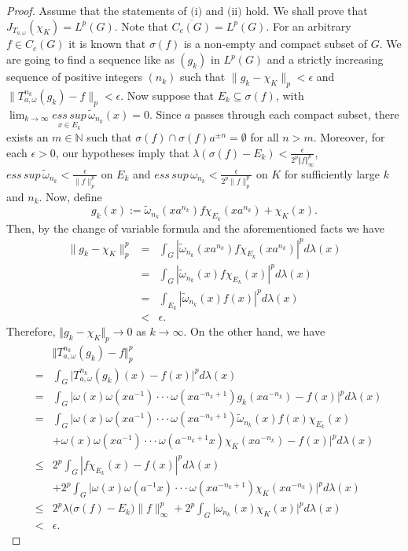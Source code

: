 \documentclass{amsart}
\theoremstyle{definition}\newtheorem{defn}[thm]{Definition}
\theoremstyle{remark}
\numberwithin{equation}{section}
\begin{document}
\begin{proof}
Assume that the statements of $\mbox{(i)}$ and $\mbox{(ii)}$ hold. We shall prove
that $J_{T_{a,\omega}}(\chi_K)=L^p(G)$. Note that
$\overline{C_c(G)}=L^p(G)$.
 For an arbitrary $f\in C_c(G)$ it is known that
$\sigma(f)$ is a non-empty and compact subset of $G$. We are going to find a
sequence like as $(g_k)$ in $L^p(G)$ and a strictly increasing sequence of positive integers $(n_k)$ such that
$\|g_k -\chi_K\|_p<\epsilon$ and $\|T_{a,\omega}^{n_k}(g_k)-f\|_p<\epsilon$.
Now suppose that $E_k\subseteq \sigma(f)$, with $\lim_{k\rightarrow
\infty}\underset{x\in E_{k}}{ess\,sup}\,
 \tilde{\omega}_{n_k}(x)=0$.  Since $a$ passes through  each compact subset,
  there exists an $m\in\mathbb{N}$ such that $\sigma(f) \cap
\sigma(f)a^{\pm n}=\emptyset$ for all $n>m$.
 Moreover, for each $\epsilon>0$, our hypotheses  imply that
$\lambda(\sigma(f)-E_k)<\frac{\epsilon} {2^p \Vert
f\Vert_{\infty}^{p}}$,
$ess\,sup\,\tilde{\omega}_{n_k}<\frac{\epsilon}{\|f\|_{p}^p}$ on $E_k$
and $ess\,sup\,\omega_{n_k}<\frac{\epsilon}{2^p\|f\|_{p}^p}$ on $K$
for sufficiently large $k$ and $n_k$. Now, define
$$g_k(x):=\tilde{\omega}_{n_k}(xa^{n_k})f\chi_{E_k}(xa^{n_k})+\chi_{K}(x).$$ Then, by
the change of variable formula and the aforementioned facts we have
\begin{eqnarray*}
 \|g_k-\chi_{K}\|_p^p&=&\int_G|\tilde{\omega}_{n_k}(xa^{n_k})
 f\chi_{E_k}(xa^{n_k})|^p d\lambda(x) \\
  &=&\int_G|\tilde{\omega}_{n_k}(x)f\chi_{E_k}(x)|^p d\lambda(x) \\
&=&\int_{E_k}|\tilde{\omega}_{n_k}(x)f(x)|^p d\lambda(x)\\
      &<& \epsilon.
  \end{eqnarray*}
Therefore, $\Vert g_{k}-\chi_{K}\Vert_p\to 0$ as $k\to \infty$. On
the other hand, we have
\begin{eqnarray*}
&&\Vert T_{a,\omega}^{n_k}(g_k) - f\Vert_p^p
\\&=&
\int_G \vert T_{a,\omega}^{n_k}(g_k)(x) -f(x)\vert^p d\lambda(x)
\\&=&
\int_G \vert
\omega(x)\omega(xa^{-1})\cdot\cdot\cdot\omega(xa^{-n_k+1})g_k(xa^{-n_k})
-f(x)\vert^p d\lambda(x)
\\&=&
\int_G \vert
\omega(x)\omega(xa^{-1})\cdot\cdot\cdot\omega(xa^{-n_k+1})
\tilde{\omega}_{n_k}(x)f(x)\chi_{E_k}(x)\\&& +
\omega(x)\omega(xa^{-1})\cdot\cdot\cdot\omega(a^{-n_k+1}x)\chi_K(xa^{-n_k})
-f(x)\vert^p d\lambda(x)
\\&\leq&
2^p\int_G|f\chi_{E_k}(x)-f(x)|^p d\lambda(x)
\\&&+
2^p\int_G
\vert\omega(x)\omega(a^{-1}x)\cdot\cdot\cdot\omega(xa^{-n_k+1})\chi_K(xa^{-n_k})
\vert^p d\lambda(x)
\\&\leq&
2^p\lambda\big(\sigma(f)-E_k\big)\|f\|_{\infty}^p
+
2^p\int_G \vert{\omega}_{n_k}(x)\chi_K(x) \vert^p d\lambda(x)\\&<& \epsilon.
\end{eqnarray*}
\end{proof}
\end{document}
